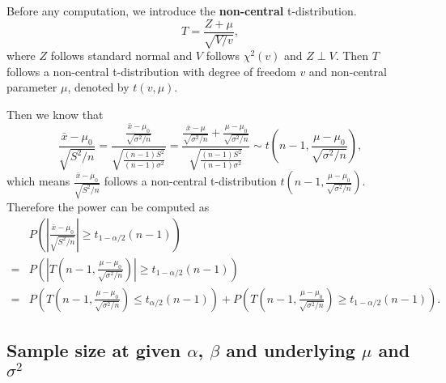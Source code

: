 \documentclass[a4paper,12pt]{article}
\begin{document}
Before any computation, we introduce the \textbf{non-central} t-distribution.
\begin{equation}
  \label{eq:noncentral-t-definition}
  T = \frac{Z + \mu}{\sqrt{V / v}}
  ,  
\end{equation}
where $Z$ follows standard normal and $V$ follows $\chi^2\left(v\right)$ and $Z\perp V$. Then $T$ follows a non-central t-distribution with degree of freedom $v$ and non-central parameter $\mu$, denoted by $t\left(v, \mu\right)$.
\par
Then we know that
\[
  \frac{\bar{x} - \mu_0}{\sqrt{S^2 / n}}
  = \frac{
    \frac{\bar{x} - \mu_0}{\sqrt{\sigma^2 / n}}
  }{
    \sqrt{
      \frac{\left(n - 1\right)S^2}{\left(n - 1\right)\sigma^2}
    }
  }
  = \frac{
    \frac{\bar{x} - \mu}{\sqrt{\sigma^2 / n}}
    + \frac{\mu - \mu_0}{\sqrt{\sigma^2 / n}}
  }{
    \sqrt{
      \frac{\left(n - 1\right)S^2}{\left(n - 1\right)\sigma^2}
    }
  }
  \sim t\left(n - 1, \frac{\mu - \mu_0}{\sqrt{\sigma^2 / n}}\right)
  ,
\]
which means $\frac{\bar{x} - \mu_0}{\sqrt{S^2 / n}}$ follows a non-central t-distribution $t\left(n - 1, \frac{\mu - \mu_0}{\sqrt{\sigma^2 / n}}\right)$. Therefore the power can be computed as
\begin{equation}
  \label{eq:power_equation_one_sample_sigma_unknown}
  \begin{aligned}
    & P\left(
      \left|
      \frac{\bar{x} - \mu_0}{\sqrt{S^2 / n}}
      \right|
      \geq t_{1 - \alpha / 2}\left(n - 1\right)
      \right)    \\
    =& P\left(
       \left|
       T\left(n - 1,  \frac{\mu - \mu_0}{\sqrt{\sigma^2 / n}}\right)
       \right|
       \geq t_{1 - \alpha / 2}\left(n - 1\right)
       \right)    \\
    =& P\left(
       T\left(n - 1,  \frac{\mu - \mu_0}{\sqrt{\sigma^2 / n}}\right)
       \leq t_{\alpha / 2}\left(n - 1\right)
       \right)
       + P\left(
       T\left(n - 1,  \frac{\mu - \mu_0}{\sqrt{\sigma^2 / n}}\right)
       \geq t_{1 - \alpha / 2}\left(n - 1\right)
       \right)
       .
  \end{aligned}  
\end{equation}

\subsection{Sample size at given $\alpha$, $\beta$ and underlying $\mu$ and $\sigma^2$}
\label{sec:sample-size-at-1}
\end{document}
